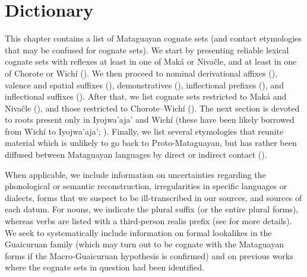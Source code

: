 \chapter{Dictionary} \label{etymdic}
\largerpage

This chapter contains a list of Mataguayan cognate sets (and contact etymologies that may be confused for cognate sets). We start by presenting reliable lexical cognate sets with reflexes at least in one of Maká or Nivaĉle, and at least in one of Chorote or Wichí (). We then proceed to nominal derivational affixes (), valence and spatial suffixes (), demonstratives (), inflectional prefixes (), and inflectional suffixes (). After that, we list cognate sets restricted to Maká and Nivaĉle (), and those restricted to Chorote--Wichí (). The next section is devoted to roots present only in Iyojwa’aja’ and Wichí (these have been likely borrowed from Wichí to Iyojwa’aja’; ). Finally, we list several etymologies that reunite material which is unlikely to go back to Proto-Mataguayan, but has rather been diffused between Mataguayan languages by direct or indirect contact ().

\hspace*{-3.1pt}When applicable, we include information on uncertainties regarding the phonological or semantic reconstruction, irregularities in specific languages or dialects, forms that we suspect to be ill-transcribed in our sources, and sources of each datum. For nouns, we indicate the plural suffix (or the entire plural forms), whereas verbs are listed with a third-person realis prefix (see  for more details). We seek to systematically include information on formal lookalikes in the Guaicuruan family (which may turn out to be cognate with the Mataguayan forms if the Macro-Guaicuruan hypothesis is confirmed) and on previous works where the cognate sets in question had been identified.

\setlength{\normalparindent}{\parindent}
\setlength{\parindent}{0pt}

\sloppy
